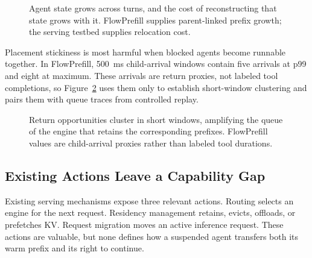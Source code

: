 \begin{figure}[t]
  \centering
  \caption{Agent state grows across turns, and the cost of reconstructing that state grows with it. FlowPrefill supplies parent-linked prefix growth; the serving testbed supplies relocation cost.}
  \label{fig:aging}
\end{figure}

Placement stickiness is most harmful when blocked agents become runnable together. In FlowPrefill, 500~ms child-arrival windows contain five arrivals at p99 and eight at maximum. These arrivals are return proxies, not labeled tool completions, so Figure~\ref{fig:returns} uses them only to establish short-window clustering and pairs them with queue traces from controlled replay.

\begin{figure}[t]
  \centering
  \caption{Return opportunities cluster in short windows, amplifying the queue of the engine that retains the corresponding prefixes. FlowPrefill values are child-arrival proxies rather than labeled tool durations.}
  \label{fig:returns}
\end{figure}

\subsection{Existing Actions Leave a Capability Gap}\label{existing-actions-leave-a-capability-gap}

Existing serving mechanisms expose three relevant actions. Routing selects an engine for the next request. Residency management retains, evicts, offloads, or prefetches KV. Request migration moves an active inference request. These actions are valuable, but none defines how a suspended agent transfers both its warm prefix and its right to continue.

